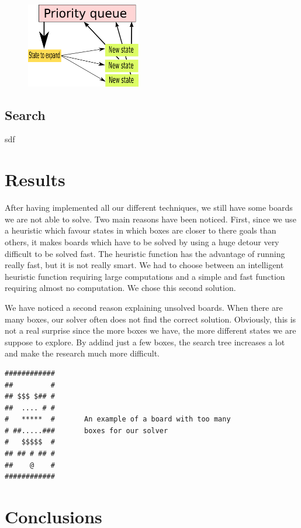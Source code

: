 \documentclass[a4paper,10pt]{article}
\begin{document}
	\begin{figure}[h]
	\centerline{\includegraphics[height=5 cm, width=5cm]{./priority_state.png}}
	\end{figure}


    \subsection{Search}
        sdf~\cite{solving_soko}


\section{Results}
After having implemented all our different techniques, we still have some boards we are not able to solve. Two main reasons have been noticed. First, since we use a heuristic which favour states in which boxes are closer to there goals than others, it makes boards which have to be solved by using a huge detour very difficult to be solved fast. The heuristic function has the advantage of running really fast, but it is not really smart. 
We had to choose between an intelligent heuristic function requiring large computations and a simple and fast function requiring almost no computation. We chose this second solution.

We have noticed a second reason explaining unsolved boards. When there are many boxes, our solver often does not find the correct solution. Obviously, this is not a real surprise since the more boxes we have, the more different states we are suppose to explore. By addind just a few boxes, the search tree increases a lot and make the research much more difficult.

\begin{verbatim}
############
##         #
## $$$ $## #
##  .... # #
#   *****  #       An example of a board with too many
# ##.....###       boxes for our solver
#   $$$$$  #
## ## # ## #
##    @    #
############
\end{verbatim}


\section{Conclusions}
   
      
 
 
	
\end{document}
